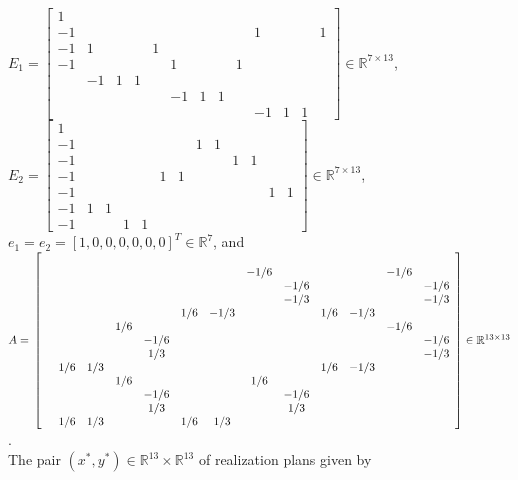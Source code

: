 \documentclass{article} %
\begin{document}
$E_1 = \left[\begin{array}{ccccccccccccc}
1 &   &   &   &   &   &   &   &   &   &   &   &  \\
-1 &   &   &   &   &   &   &   &   & 1 &   &   & 1\\
-1 & 1 &   &   & 1 &   &   &   &   &   &   &   &  \\
-1 &   &   &   &   & 1 &   &   & 1 &   &   &   &  \\
  & -1 & 1 & 1 &   &   &   &   &   &   &   &   &  \\
  &   &   &   &   & -1 & 1 & 1 &   &   &   &   &  \\
  &   &   &   &   &   &   &   &   & -1 & 1 & 1 &  
\end{array}\right] \in \mathbb{R}^{7 \times 13}$,
$E_2 = \left[\begin{array}{ccccccccccccc}
1 &   &   &   &   &   &   &   &   &   &   &   &  \\
-1 &   &   &   &   &   &   & 1 & 1 &   &   &   &  \\
-1 &   &   &   &   &   &   &   &   & 1 & 1 &   &  \\
-1 &   &   &   &   & 1 & 1 &   &   &   &   &   &  \\
-1 &   &   &   &   &   &   &   &   &   &   & 1 & 1\\
-1 & 1 & 1 &   &   &   &   &   &   &   &   &   &  \\
-1 &   &   & 1 & 1 &   &   &   &   &   &   &   &  
\end{array}\right] \in \mathbb{R}^{7 \times 13}$, $e_1 = e_2 = [1, 0,
  0, 0, 0, 0, 0]^T \in \mathbb{R}^7$, and $A =
\\\left[\begin{array}{ccccccccccccc}

  &   &   &   &   &   &   &   &   &   &   &   &  \\
  &   &   &   &   &   &   & -1 / 6 &   &   &   & -1 / 6 &  \\
  &   &   &   &   &   &   &   & -1 / 6 &   &   &   & -1 / 6\\
  &   &   &   &   &   &   &   & -1 / 3 &   &   &   & -1 / 3\\
  &   &   &   &   & 1 / 6 & -1 / 3 &   &   & 1 / 6 & -1 / 3 &   &  \\
  &   &   & 1 / 6 &   &   &   &   &   &   &   & -1 / 6 &  \\
  &   &   &   & -1 / 6 &   &   &   &   &   &   &   & -1 / 6\\
  &   &   &   & 1 / 3 &   &   &   &   &   &   &   & -1 / 3\\
  & 1 / 6 & 1 / 3 &   &   &   &   &   &   & 1 / 6 & -1 / 3 &   &  \\
  &   &   & 1 / 6 &   &   &   & 1 / 6 &   &   &   &   &  \\
  &   &   &   & -1 / 6 &   &   &   & -1 / 6 &   &   &   &  \\
  &   &   &   & 1 / 3 &   &   &   & 1 / 3 &   &   &   &  \\
  & 1 / 6 & 1 / 3 &   &   & 1 / 6 & 1 / 3 &   &   &   &   &   &  
\end{array}\right] \in \mathbb{R}^{13 \times 13}$.\\
The pair $(x^*, y^*) \in \mathbb{R}^{13} \times \mathbb{R}^{13}$ of
realization plans given by
\end{document}
